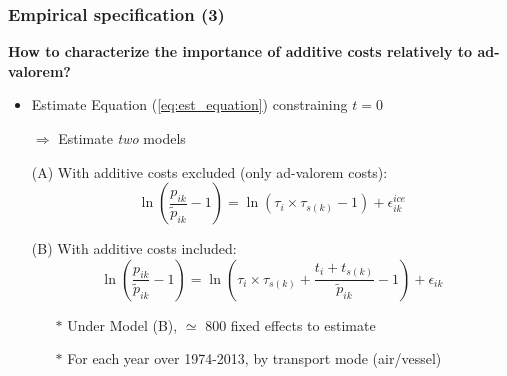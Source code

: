 \documentclass[10 pt,Helvetica, french]{beamer}
\begin{document}
\begin{frame}
\frametitle{Empirical specification (3)}
\textbf{How to characterize the importance of additive costs relatively to ad-valorem?} \vspace{0.1cm}
\begin{itemize}
\item Estimate Equation (\ref{eq:est_equation}) constraining $t=0$ \vspace{0.1cm}
\item[$\Rightarrow$] Estimate \textit{two} models\vspace{0.1cm}
\item[(A)] With additive costs excluded (only ad-valorem costs):
\footnotesize
\begin{equation}
\ln\left(\frac{p_{ik}}{\widetilde{p}_{ik}}-1 \right)= \ln \left(\tau_{i} \times \tau_{s(k)}-1 \right) + \epsilon^{ice}_{ik} \label{eq:model_nlI}
\end{equation}
\normalsize
\item[(B)] With additive costs included:
\footnotesize
\begin{equation}
\ln\left(\frac{p_{ik}}{\widetilde{p}_{ik}}-1 \right)= \ln \left(\tau_{i} \times \tau_{s(k)}+\frac{t_{i} + t_{s(k)}}{\widetilde{p}_{ik}}-1 \right) + \epsilon_{ik} \label{eq:est_equation}
\end{equation}
\normalsize
\begin{itemize}
\item[$\ast$] Under Model (B), $\simeq$ 800 fixed effects to estimate  \vspace{0.1cm}
\item[$\ast$] For each year over 1974-2013, by transport mode (air/vessel)
\end{itemize}
\end{itemize}
\end{frame}
\end{document}
